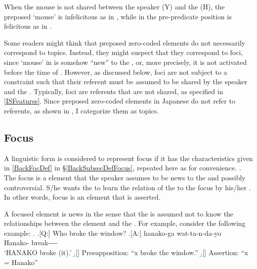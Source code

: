 When the mouse is not shared between the speaker (Y) and the  (H),
the preposed  `mouse' is infelicitous as in \Last[Y],
while  in the pre-predicate position is felicitous as in \Last[Y$^{\prime}$].

%

Some readers might think that preposed zero-coded elements do not necessarily correspond to topics.
Instead, they might suspect that they correspond to foci,
since  `mouse' in \LLast is somehow ``new'' to the ,
or, more precisely,
it is not activated before the time of  \LLast[Y].
However, as discussed below,
foci are not subject to a constraint such that their referent must be assumed to be shared by the speaker and the .
Typically, foci are  referents that are not shared, as specified in \ref{ISFeatures}.
Since preposed zero-coded elements in Japanese do not refer to  referents, as shown in \Last,
I categorize them as topics.

\subsection{Focus}\label{FrameworkFocus}

A linguistic form is considered to represent focus if it has the characteristics given in \ref{BackFocDef} in \S \ref{BackSubsecDefFocus},
repeated here as \Next for convenience.
%
\ex. The focus is a  element that the speaker assumes to be news to the  and possibly controversial.
S/he wants the  to learn the relation of the  to the focus by his/her .
In other words, focus is an element that is asserted.
\label{FocDef}

A focused  element is news in the sense that
the  is assumed not to know the relationships between the element and the .
For example,
consider the following example:
\ex. \a.[Q:] Who broke the window?
	\bg.[A:] hanako-ga wat-ta-n-da-yo \\
		Hanako- break---- \\
		`HANAKO broke (it).'
	\b.[] Presupposition: ``x broke the window.''
	\b.[] Assertion: ``x = Hanako''

